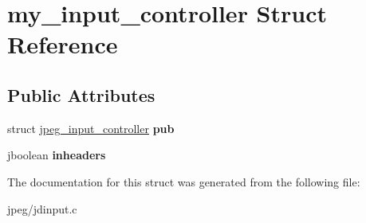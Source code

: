 \hypertarget{structmy__input__controller}{}\section{my\+\_\+input\+\_\+controller Struct Reference}
\label{structmy__input__controller}
\subsection*{Public Attributes}
\begin{DoxyCompactItemize}
\item 
struct \hyperlink{structjpeg__input__controller}{jpeg\+\_\+input\+\_\+controller} {\bfseries pub}\hypertarget{structmy__input__controller_a4ccad4a8586a7c91d0d71b45d0e78514}{}\label{structmy__input__controller_a4ccad4a8586a7c91d0d71b45d0e78514}

\item 
jboolean {\bfseries inheaders}\hypertarget{structmy__input__controller_a29150b636089e761c1fe4cf97fb23c42}{}\label{structmy__input__controller_a29150b636089e761c1fe4cf97fb23c42}

\end{DoxyCompactItemize}


The documentation for this struct was generated from the following file\+:\begin{DoxyCompactItemize}
\item 
jpeg/jdinput.\+c\end{DoxyCompactItemize}
